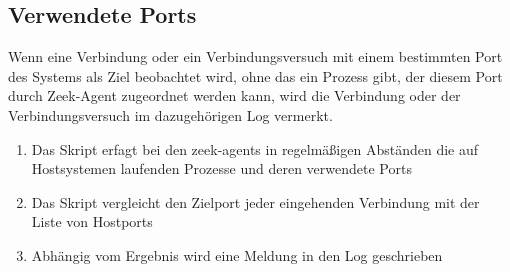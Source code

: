 \subsection{Verwendete Ports}
Wenn eine Verbindung oder ein Verbindungsversuch mit einem bestimmten Port des Systems als Ziel beobachtet wird, ohne das ein Prozess gibt, der diesem Port durch Zeek-Agent zugeordnet werden kann, wird die Verbindung oder der Verbindungsversuch im dazugehörigen Log vermerkt.
\begin{enumerate}
\item{Das Skript erfagt bei den zeek-agents in regelmäßigen Abständen die auf Hostsystemen laufenden Prozesse und deren verwendete Ports}
\item{Das Skript vergleicht den Zielport jeder eingehenden Verbindung mit der Liste von Hostports}
\item{Abhängig vom Ergebnis wird eine Meldung in den Log geschrieben}
\end{enumerate}
